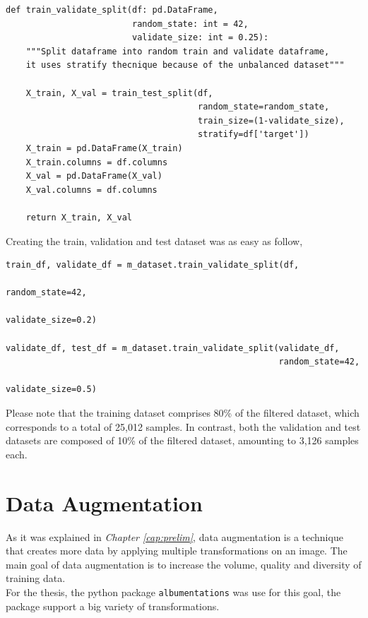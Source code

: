 \begin{Verbatim}[fontsize=\small]
def train_validate_split(df: pd.DataFrame,
                         random_state: int = 42,
                         validate_size: int = 0.25):
    """Split dataframe into random train and validate dataframe,
    it uses stratify thecnique because of the unbalanced dataset"""

    X_train, X_val = train_test_split(df,
                                      random_state=random_state,
                                      train_size=(1-validate_size),
                                      stratify=df['target'])
    X_train = pd.DataFrame(X_train)
    X_train.columns = df.columns
    X_val = pd.DataFrame(X_val)
    X_val.columns = df.columns

    return X_train, X_val
\end{Verbatim}

Creating the train, validation and test dataset was as easy as follow, 

\begin{Verbatim}[fontsize=\small]
train_df, validate_df = m_dataset.train_validate_split(df,
                                                       random_state=42,
                                                       validate_size=0.2)

validate_df, test_df = m_dataset.train_validate_split(validate_df,
                                                      random_state=42,
                                                      validate_size=0.5)    
\end{Verbatim}

Please note that the training dataset comprises 80\% of the filtered dataset, which corresponds to a total of 25,012 samples. In contrast, both the validation and test datasets are composed of 10\% of the filtered dataset, amounting to 3,126 samples each.

\section{Data Augmentation}

As it was explained in \textit{Chapter \ref{cap:prelim}}, data augmentation is a technique that
creates more data by applying multiple transformations on an image. The  main goal of data augmentation is to increase the volume, quality and diversity of training data. \\

For the thesis, the python package {\tt albumentations} was use for this goal, the package support a big variety of transformations.

